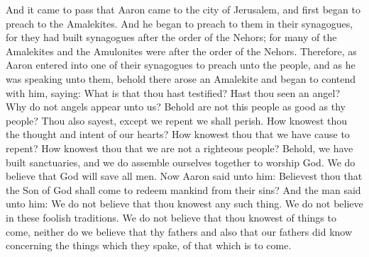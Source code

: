 And it came to pass that Aaron came to the city of Jerusalem, and first began to preach to the Amalekites. And he began to preach to them in their synagogues, for they had built synagogues after the order of the Nehors; for many of the Amalekites and the Amulonites were after the order of the Nehors.
\bverse \iffalse Therefore, as Aaron entered into one of their synagogues to preach unto the people, and as he was speaking unto them, behold there arose an Amalekite and began to contend with him, saying: What is that thou hast testified? Hast thou seen an angel? Why do not angels appear unto us? Behold are not this people as good as thy people? \fi
Therefore, as Aaron entered into one of their synagogues to preach unto the people, and as he was speaking unto them, behold there arose an Amalekite and began to contend with him, saying: What is that thou hast testified? Hast thou seen an angel? Why do not angels appear unto us? Behold are not this people as good as thy people?
\bverse \iffalse Thou also sayest, except we repent we shall perish. How knowest thou the thought and intent of our hearts? How knowest thou that we have cause to repent? How knowest thou that we are not a righteous people? Behold, we have built sanctuaries, and we do assemble ourselves together to worship God. We do believe that God will save all men. \fi
Thou also sayest, except we repent we shall perish. How knowest thou the thought and intent of our hearts? How knowest thou that we have cause to repent? How knowest thou that we are not a righteous people? Behold, we have built sanctuaries, and we do assemble ourselves together to worship God. We do believe that God will save all men.
\bverse \iffalse Now Aaron said unto him: Believest thou that the Son of God shall come to redeem mankind from their sins? \fi
Now Aaron said unto him: Believest thou that the Son of God shall come to redeem mankind from their sins?
\bverse \iffalse And the man said unto him: We do not believe that thou knowest any such thing. We do not believe in these foolish traditions.  We do not believe that thou knowest of things to come, neither do we believe that thy fathers and also that our fathers did know concerning the things which they spake, of that which is to come. \fi
And the man said unto him: We do not believe that thou knowest any such thing. We do not believe in these foolish traditions.  We do not believe that thou knowest of things to come, neither do we believe that thy fathers and also that our fathers did know concerning the things which they spake, of that which is to come.

